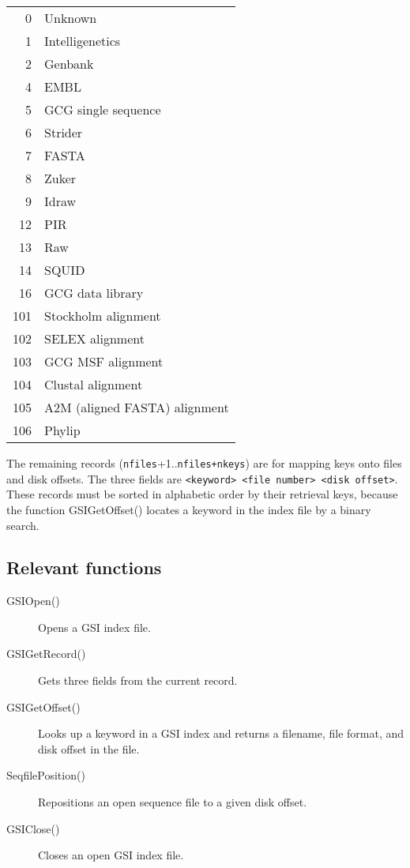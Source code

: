 \begin{tabular}{rl}
0  & Unknown    \\   
1  & Intelligenetics\\ 
2  & Genbank\\ 
4  & EMBL\\ 
5  & GCG single sequence\\ 
6  & Strider        \\ 
7  & FASTA\\ 
8  & Zuker\\ 
9  & Idraw\\ 
12 & PIR\\ 
13 & Raw\\ 
14 & SQUID\\ 
16 & GCG data library \\ 
101& Stockholm alignment\\
102& SELEX alignment\\
103& GCG MSF alignment\\
104& Clustal alignment\\
105& A2M (aligned FASTA) alignment\\
106& Phylip\\
\end{tabular}

The remaining records ({\tt nfiles}+1..{\tt nfiles+nkeys}) are for
mapping keys onto files and disk offsets. The three fields are
\verb+<keyword> <file number> <disk offset>+. These records must be
sorted in alphabetic order by their retrieval keys, because the
function GSIGetOffset() locates a keyword in the index file by a
binary search.

\subsection{Relevant functions}
\begin{description}
\item[GSIOpen()] 
 	Opens a GSI index file.
\item[GSIGetRecord()]
 	Gets three fields from the current record.
\item[GSIGetOffset()] 
      Looks up a keyword in a GSI index and returns a filename,
      file format, and disk offset in the file.
\item[SeqfilePosition()] 
      Repositions an open sequence file to a given disk offset.
\item[GSIClose()]
      Closes an open GSI index file.
\end{description}




